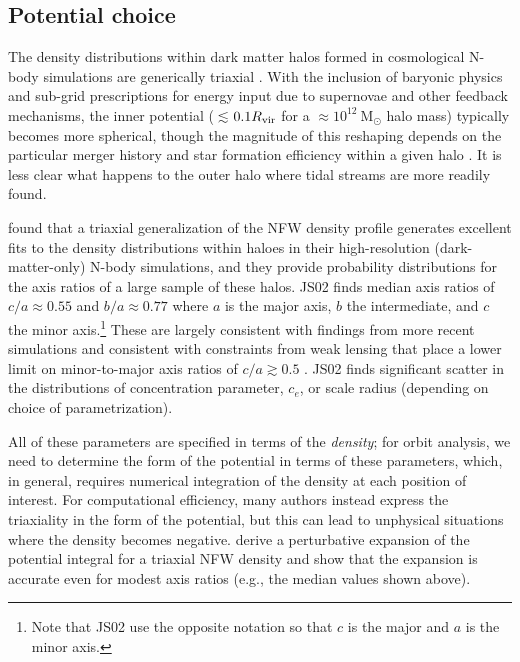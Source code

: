 \documentclass[letterpaper,12pt,preprint]{aastex}
\newcommand{\msun}{\ensuremath{\mathrm{M}_\odot}}
\begin{document}
\subsection{Potential choice}\label{sec:potential}

The density distributions within dark matter halos formed in cosmological N-body simulations are generically triaxial \citep[e.g.,][]{jing02, bett07, zemp09, veraciro11}. With the inclusion of baryonic physics and sub-grid prescriptions for energy input due to supernovae and other feedback mechanisms, the inner potential ($\lesssim$$0.1R_{\rm vir}$ for a $\approx$$10^{12}~\msun$ halo mass) typically becomes more spherical, though the magnitude of this reshaping depends on the particular merger history and star formation efficiency within a given halo \citep[e.g.,][]{dubinski??, butsky15}. It is less clear what happens to the outer halo where tidal streams are more readily found. %

 \citet[][hereafter JS02]{jing02} found that a triaxial generalization of the NFW density profile \citep{navarro96} generates excellent fits to the density distributions within haloes in their high-resolution (dark-matter-only) N-body simulations, and they provide probability distributions for the axis ratios of a large sample of these halos. JS02 finds median axis ratios of $c/a \approx 0.55$ and $b/a \approx 0.77$ where $a$ is the major axis, $b$ the intermediate, and $c$ the minor axis.\footnote{Note that JS02 use the opposite notation so that $c$ is the major and $a$ is the minor axis.} These are largely consistent with findings from more recent simulations \citep[e.g.,][]{millenium, hmm, butsky15} and consistent with constraints from weak lensing that place a lower limit on minor-to-major axis ratios of $c/a\gtrsim0.5$ \citep{vanuitert12}. JS02 finds significant scatter in the distributions of concentration parameter, $c_e$, or scale radius (depending on choice of parametrization). 

All of these parameters are specified in terms of the \emph{density}; for orbit analysis, we need to determine the form of the potential in terms of these parameters, which, in general, requires numerical integration of the density at each position of interest. For computational efficiency, many authors instead express the triaxiality in the form of the potential, but this can lead to unphysical situations where the density becomes negative. \citet{leesuto03} derive a perturbative expansion of the potential integral for a triaxial NFW density and show that the expansion is accurate even for modest axis ratios (e.g., the median values shown above). 
\end{document}
